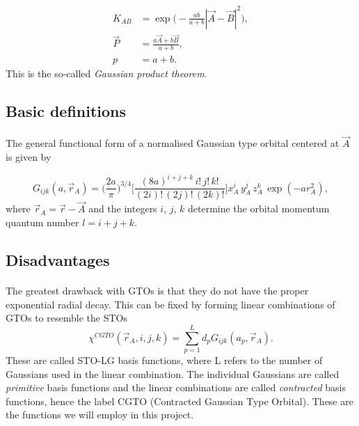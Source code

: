 \documentclass[%
twoside,                 %
final,                   %
10pt]{article}
\begin{document}
\begin{align}
 K_{AB} & =  \exp\Big(-\frac{ab}{a + b}|\vec A - \vec B|^2\Big), \\
 \vec P & =  \frac{a \vec A + b \vec B}{a + b}, \\
 p & =  a + b.
\end{align}
This is the so-called \emph{Gaussian product theorem}.



\subsection*{Basic definitions}

\paragraph{}

The general functional form of a normalised Gaussian type orbital 
centered at $\vec A$ is given by

\begin{equation}
 G_{ijk}(a, \vec r_A) = \Big(\frac{2a}{\pi}\Big)^{3/4}\Big[\frac{(8a)^{i+j+k}\,i!\,j!\,k!}{(2i)!\,(2j)!\,(2k)!}\Big]x_A^i\,y_A^j\,z_A^k\,\exp(-a r_A^2),
\end{equation}
where $\vec r_A = \vec r - \vec A$ and the integers $i$, $j$, $k$ determine the orbital momentum quantum number $l=i+j+k$.



\subsection*{Disadvantages}

\paragraph{}

The greatest drawback with GTOs is that they do not have the proper exponential radial decay. This can be fixed by forming linear combinations of GTOs
to resemble the STOs
\begin{equation}
 \chi^{CGTO}(\vec r_A,i,j,k) = \sum_{p=1}^L d_p G_{ijk}(a_p, \vec r_A).
\end{equation}
These are called STO-LG basis functions, where L refers to the number of Gaussians used in the linear combination.
The individual Gaussians are called \emph{primitive} basis functions and the linear combinations are called \emph{contracted} basis functions, hence the label
CGTO (Contracted Gaussian Type Orbital). These are the functions we will employ in this project.
\end{document}
